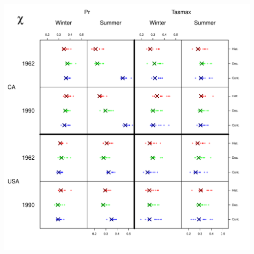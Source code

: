 \documentclass[mathserif, 11pt, t]{beamer}
\begin{document}
\begin{frame}
\begin{center}
\includegraphics[scale=0.34]{figs/chi4.pdf}
\end{center}
\end{frame}
\end{document}
